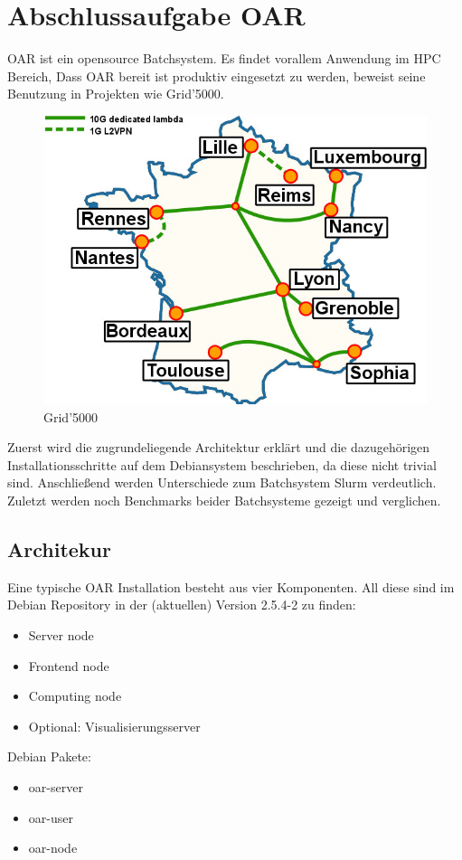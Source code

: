 \chapter{Abschlussaufgabe OAR}
OAR ist ein opensource Batchsystem. Es findet vorallem Anwendung im HPC Bereich,
Dass OAR bereit ist produktiv eingesetzt zu werden, beweist seine Benutzung in Projekten wie Grid'5000.
\begin{figure}[H]
	\centering
	\includegraphics[scale=1.5]{grid5000.jpg} 
	\vspace{-10pt}
	\caption{Grid'5000}
\end{figure}
Zuerst wird die zugrundeliegende Architektur erklärt und die dazugehörigen Installationsschritte auf dem Debiansystem beschrieben,
da diese nicht trivial sind.
Anschließend werden Unterschiede zum Batchsystem Slurm verdeutlich.
Zuletzt werden noch Benchmarks beider Batchsysteme gezeigt und verglichen.\pagebreak
\section{Architekur}
Eine typische OAR Installation besteht aus vier Komponenten. All diese sind im Debian Repository in der (aktuellen) Version 2.5.4-2 
zu finden:
    \begin{itemize}
        \item{Server node}
        \item{Frontend node}
        \item{Computing node}
        \item{Optional: Visualisierungsserver}
    \end{itemize}
    Debian Pakete:
    \begin{itemize}
        \item{oar-server}
        \item{oar-user}
        \item{oar-node}
    \end{itemize}

